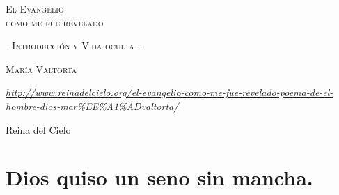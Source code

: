 \documentclass[12pt, twoside, openright]{book} %
\begin{document}
\begin{titlepage}
\centering
\vspace{3.5cm}
{\scshape\LARGE El Evangelio\\como me fue revelado\par}
{\scshape - Introducción y Vida oculta - \par}
\vfill
{\scshape\Large María Valtorta \par}
\vfill
{\itshape \url{http://www.reinadelcielo.org/el-evangelio-como-me-fue-revelado-poema-de-el-hombre-dios-mar%EE%A1%ADvaltorta/} \par}
\vfill
Reina del Cielo
\end{titlepage}

\frenchspacing
\chapter*{Dios quiso un seno sin mancha.}
\end{document}
